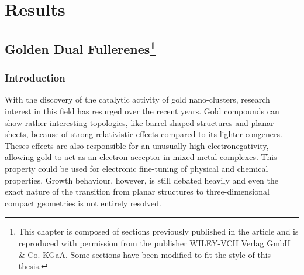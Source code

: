 
\part{Results}
\label{sec:results}

\chapter[Golden Dual Fullerenes]{Golden Dual Fullerenes\footnote{This chapter is
    composed of sections previously published in the article
    \autocite{Trombach_HollowGoldCages_2016}
    and is reproduced with permission from the publisher 
    WILEY-VCH Verlag GmbH \& Co. KGaA. Some sections have been modified to fit
    the style of this thesis.}}
\label{sec:goldendualfullerenes}

\section{Introduction}
\label{sec:introGold}

With the discovery of the catalytic activity of gold
nano-clusters\autocite{Haruta1987,Haruta2003,Haruta2007,Haruta2007a}, research
interest in this field has resurged over the recent
years\autocite{Schwerdtfeger_Goldgoesnano_2003,Hakkinen2008,Maity2012,Zhang2012a,Gong2012,Miao2012,Kyoungweon-2013}.
Gold compounds can show rather interesting topologies, like barrel shaped
structures\autocite{Chen-2015} and planar
sheets,\autocite{Bravo-Perez-1999,Hakkinen2000,Landman2002} because of strong
relativistic effects compared to its lighter
congeners\autocite{Pyykko-1988,Schwerdtfeger-2002HA,Pyykko-2004,Pyykko-2007a,Huang-2008,Schwerdtfeger-Lein-2009,pyykko-2012relativistic}.
Theses effects are also responsible for an unusually high electronegativity,
allowing gold to act as an electron acceptor in mixed-metal
complexes.\autocite{Schwerdtfeger-2002HA} This property could be used for
electronic fine-tuning of physical and chemical
properties.\autocite{Schwerdtfeger_Goldgoesnano_2003} Growth behaviour, however,
is still debated heavily\autocite{Zhao-2010,Barnard-2010,Tian-2011} and even the
exact nature of the transition from planar structures to three-dimensional
compact geometries is not entirely
resolved.\autocite{Johansson_2D3Dtransitiongold_2008,Fa-Luong-2008,Assadollahzadeh_systematicsearchminimum_2009,Wang-Pal-2010,Wang-Wang-2011,Wang-Wang-2011,Barnard-2012,Gotz_performancedensityfunctional_2013}

